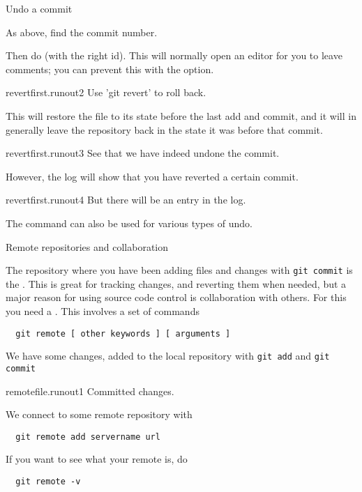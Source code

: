 \newpage
{} {Undo a commit}

As above, find the commit number.

Then do  (with the right id).
This will normally open an editor for you to leave comments;
you can prevent this with the  option.

\begin{gitstep}{revertfirst.runout2}
  Use 'git revert' to roll back.
\end{gitstep}

This will restore the file to its state before the last
add and commit, and it will in generally leave the repository back
in the state it was before that commit.

\begin{gitstep}{revertfirst.runout3}
  See that we have indeed undone the commit.
\end{gitstep}

However, the log will show that you have reverted a certain commit.

\begin{gitstep}{revertfirst.runout4}
  But there will be an entry in the log.
\end{gitstep}

The  command can also be used for various
types of undo.

\newpage
{} {Remote repositories and collaboration}
\label{sec:git-remote}

The repository where you have been adding files and changes with
\lstinline{git commit} is the .
This is great for tracking changes, and reverting them when needed,
but a major reason for using source code control is collaboration
with others.
For this you need a .
This involves a set of commands
\begin{lstlisting}
  git remote [ other keywords ] [ arguments ]
\end{lstlisting}

We have some changes, added to the local repository
with \lstinline{git add} and \lstinline{git commit}

\begin{gitstep}{remotefile.runout1}
  Committed changes.
\end{gitstep}

We connect to some remote repository with
\begin{lstlisting}
  git remote add servername url
\end{lstlisting}
If you want to see what your remote is, do
\begin{lstlisting}
  git remote -v
\end{lstlisting}

